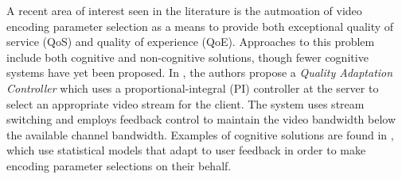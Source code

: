 
A recent area of interest seen in the literature is the autmoation of video encoding parameter selection as a means to provide both exceptional quality of service (QoS) and quality of experience (QoE). Approaches to this problem include both cognitive and non-cognitive solutions, though fewer cognitive systems have yet been proposed. In \cite{FeedbackControl}, the authors propose a \emph{Quality Adaptation Controller} which uses a proportional-integral (PI) controller at the server to select an appropriate video stream for the client. The system uses stream switching and employs feedback control to maintain the video bandwidth below the available channel bandwidth. Examples of cognitive solutions are found in \cite{pan2007quality}, which use statistical models that adapt to user feedback in order to make encoding parameter selections on their behalf. %

